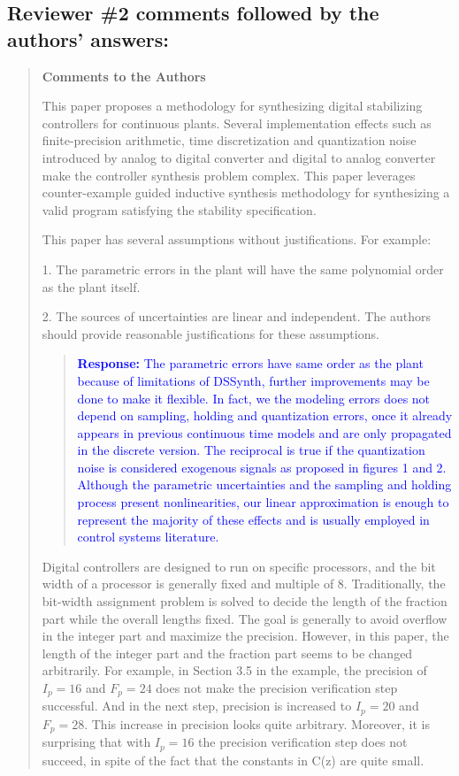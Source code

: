 \documentclass[11pt]{article}
\begin{document}
\subsection*{Reviewer \#2 comments followed by the authors' answers:}
\begin{quote}

{\bf Comments to the Authors}

This paper proposes a methodology for synthesizing digital stabilizing controllers for continuous plants. Several implementation effects such as finite-precision arithmetic, time discretization and quantization noise introduced by analog to digital converter and digital to analog converter make the controller synthesis problem complex. This paper leverages counter-example guided inductive synthesis methodology for synthesizing a valid program satisfying the stability specification.  

This paper has several assumptions without justifications. For example:

1. The parametric errors in the plant will have the same polynomial order as the plant itself.

2. The sources of uncertainties are linear and independent.
The authors should provide reasonable justifications for these assumptions.

\begin{quote}
\textcolor{blue}{\textbf{Response:} The parametric errors have same order as the plant because of limitations of DSSynth, further improvements may be done to make it flexible. In fact, we the modeling errors does not depend on sampling, holding and quantization errors, once it already appears in previous continuous time models and are only propagated in the discrete version. The reciprocal is true if the quantization noise is considered exogenous signals as proposed in figures 1 and 2. Although the parametric uncertainties and the sampling and holding process present nonlinearities, our linear approximation is enough to represent the majority of these effects and is usually employed in control systems literature.}
\end{quote}

Digital controllers are designed to run on specific processors, and the bit width of a processor is generally fixed and multiple of 8. Traditionally, the bit-width assignment problem is solved to decide the length of the fraction part while the overall lengths fixed. The goal is generally to avoid overflow in the integer part and maximize the precision. However, in this paper, the length of the integer part and the fraction part seems to be changed arbitrarily. For example, in Section 3.5 in the example, the precision of $I_p = 16$ and $F_p = 24$ does not make the precision verification step successful. And in the next step, precision is increased to $I_p = 20$ and $F_p = 28$. This increase in precision looks quite arbitrary. Moreover, it is surprising that with $I_p = 16$ the precision verification step does not succeed, in spite of the fact that the constants in C(z) are quite small.


\end{quote}
\end{document}

